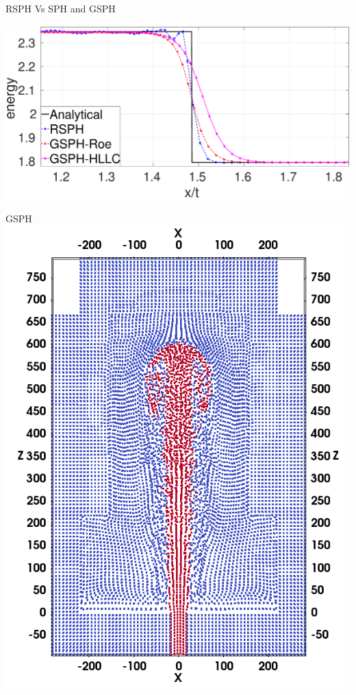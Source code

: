\documentclass{beamer}
\begin{document}
\begin{frame}{RSPH Vs SPH and GSPH}
\begin{minipage}{0.35 \textwidth}
        \centering
        \includegraphics[width=0.99 \textwidth]{./Chapter-4/Figures/Sod/RCM-Sod-GSPH-compare-e-zoom}
\end{minipage}
%
\begin{minipage}{0.64 \textwidth}
	\begin{minipage}[b][][b]{.49 \textwidth}
       \centering \small{GSPH}
        \includegraphics[width=0.99 \textwidth]{./Chapter-4/Figures/GSPH-HLLC-t3-cutView}

\end{minipage}
\end{minipage}
\end{frame}
\end{document}
